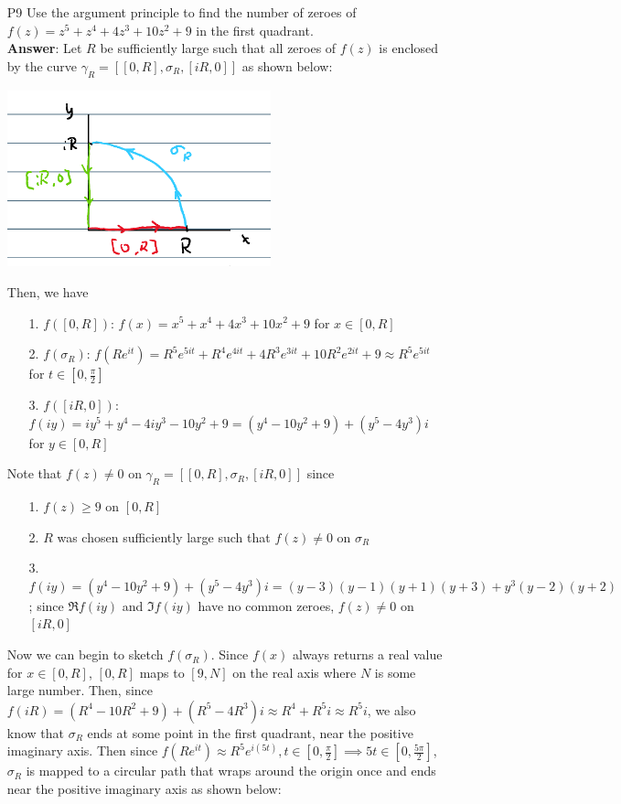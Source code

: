 \documentclass{article}
\begin{document}
\newpage
\begin{itemize}
      \item [P9] Use the argument principle to find the number of zeroes of $f(z)=z^5+z^4+4z^3+10z^2+9$ in the first quadrant.\\
            \textbf{Answer}: Let $R$ be sufficiently large such that all zeroes of $f(z)$ is enclosed by the curve $\gamma_R=[[0,R],\sigma_R,[iR,0]]$ as shown below:
            \begin{center}
                  \includegraphics[width=3in]{p9-1.png}
            \end{center}
            Then, we have
            \begin{itemize}
                  \item [1.] $f([0,R])$: $f(x)=x^5+x^4+4x^3+10x^2+9$ for $x\in[0,R]$
                  \item [2.] $f(\sigma_R)$: $f(Re^{it})=R^5e^{5it}+R^4e^{4it}+4R^3e^{3it}+10R^2e^{2it}+9\approx R^5e^{5it}$ for $t\in[0,\frac{\pi}{2}]$
                  \item [3.] $f([iR,0])$: $f(iy)=iy^5+y^4-4iy^3-10y^2+9=(y^4-10y^2+9)+(y^5-4y^3)i$ for $y\in[0,R]$
            \end{itemize}
            Note that $f(z)\neq 0$ on $\gamma_R=[[0,R],\sigma_R,[iR,0]]$ since
            \begin{itemize}
                  \item [1.] $f(z)\geq 9$ on $[0,R]$
                  \item [2.] $R$ was chosen sufficiently large such that $f(z)\neq 0$ on $\sigma_R$
                  \item [3.] $f(iy)=(y^4-10y^2+9)+(y^5-4y^3)i=(y-3)(y-1)(y+1)(y+3)+y^3(y-2)(y+2)$; since $\Re f(iy)$ and $\Im f(iy)$ have no common zeroes, $f(z)\neq 0$ on $[iR,0]$
            \end{itemize}
            Now we can begin to sketch $f(\sigma_R)$. Since $f(x)$ always returns a real value for $x\in[0,R]$, $[0,R]$ maps to $[9,N]$ on the real axis where $N$ is some large number. Then, since $f(iR)=(R^4-10R^2+9)+(R^5-4R^3)i\approx R^4+R^5i\approx R^5i$, we also know that $\sigma_R$ ends at some point in the first quadrant, near the positive imaginary axis. Then since $f(Re^{it})\approx R^5e^{i(5t)},t\in[0,\frac{\pi}{2}]\implies 5t\in[0,\frac{5\pi}{2}]$, $\sigma_R$ is mapped to a circular path that wraps around the origin once and ends near the positive imaginary axis as shown below:

\end{itemize}
\end{document}
